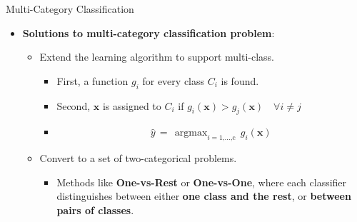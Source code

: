\documentclass[serif, aspectratio=169]{beamer}
\DeclareMathOperator*{\argmax}{argmax}
\begin{document}
\begin{frame}{Multi-Category Classification}
    \begin{itemize}
        \item \textbf{Solutions to multi-category classification problem}:
        \medskip
        \begin{itemize}\itemsep1.5em
            \item Extend the learning algorithm to support multi-class.
            \medskip
            \begin{itemize}\itemsep1em
                \item First, a function \(g_i\) for every class \(C_i\) is found.
                \item Second, \(\mathbf{x}\) is assigned to \(C_i\) if \(g_i(\mathbf{x}) > g_j(\mathbf{x}) \quad \forall i \neq j\)
                \item[] \[\hat{y} \, = \, \argmax_{i=\text{1,...,c}} \, g_i(\mathbf{x})\]
            \end{itemize}
            \item Convert to a set of two-categorical problems.
            \medskip
            \begin{itemize}
                \item Methods like \textbf{One-vs-Rest} or \textbf{One-vs-One}, where each classifier distinguishes between either \textbf{one class and the rest}, or \textbf{between pairs of classes}.
            \end{itemize}
        \end{itemize}
    \end{itemize}
\end{frame}
\end{document}
